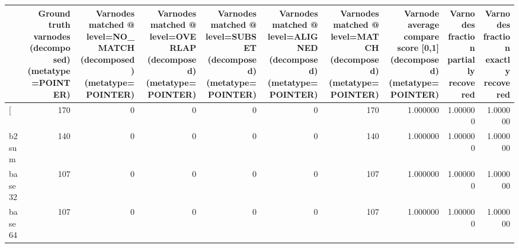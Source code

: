 \begin{tabular}{lrrrrrrrrr}
\toprule
{} &  Ground truth varnodes (decomposed) (metatype=POINTER) &  Varnodes matched @ level=NO\_MATCH (decomposed) (metatype=POINTER) &  Varnodes matched @ level=OVERLAP (decomposed) (metatype=POINTER) &  Varnodes matched @ level=SUBSET (decomposed) (metatype=POINTER) &  Varnodes matched @ level=ALIGNED (decomposed) (metatype=POINTER) &  Varnodes matched @ level=MATCH (decomposed) (metatype=POINTER) &  Varnode average compare score [0,1] (decomposed) (metatype=POINTER) &  Varnodes fraction partially recovered &  Varnodes fraction exactly recovered \\
\midrule
[         &                                                170 &                                                  0 &                                                  0 &                                                  0 &                                                  0 &                                                170 &                                           1.000000 &                               1.000000 &                             1.000000 \\
b2sum     &                                                140 &                                                  0 &                                                  0 &                                                  0 &                                                  0 &                                                140 &                                           1.000000 &                               1.000000 &                             1.000000 \\
base32    &                                                107 &                                                  0 &                                                  0 &                                                  0 &                                                  0 &                                                107 &                                           1.000000 &                               1.000000 &                             1.000000 \\
base64    &                                                107 &                                                  0 &                                                  0 &                                                  0 &                                                  0 &                                                107 &                                           1.000000 &                               1.000000 &                             1.000000 \\

\end{tabular}
